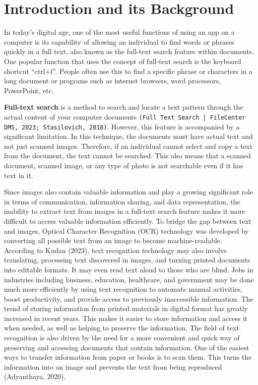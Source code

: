 \part{Introduction and its Background}

\hspace\parindent
In today’s digital age, one of the most useful functions of using an app on a computer is its
capability of allowing an individual to find words or phrases quickly in a full text, also known as
the full-text search feature within documents. One popular function that uses the concept of
full-text search is the keyboard shortcut “ctrl+f”. People often use this to find a specific phrase
or characters in a long document or programs such as internet browsers, word processors,
PowerPoint, etc.

\hfill

\textbf{Full-text search} is a method to search and locate a text pattern through the actual content
of your computer documents \texttt{(Full Text Search | FileCenter DMS, 2023; Stasilovich, 2018)}.
However, this feature is accompanied by a significant limitation. In this technique, the documents
must have actual text and not just scanned images. Therefore, if an individual cannot select and
copy a text from the document, the text cannot be searched. This also means that a scanned document,
scanned image, or any type of photo is not searchable even if it has text in it.  

\hfill

Since images also contain valuable information and play a growing significant role in terms of
communication, information sharing, and data representation, the inability to extract text from
images in a full-text search feature makes it more difficult to access valuable information
efficiently. To bridge the gap between text and images, Optical Character Recognition (OCR)
technology was developed by converting all possible text from an image to become machine-readable.
According to Kudan (2023), text recognition technology may also involve translating, processing text
discovered in images, and turning printed documents into editable formats. It may even read text
aloud to those who are blind. Jobs in industries including business, education, healthcare, and
government may be done much more efficiently by using text recognition to automate manual
activities, boost productivity, and provide access to previously inaccessible information. The trend
of storing information from printed materials in digital format has greatly increased in recent
years. This makes it easier to store information and access it when needed, as well as helping to
preserve the information. The field of text recognition is also driven by the need for a more
convenient and quick way of preserving and accessing documents that contain information. One of the
easiest ways to transfer information from paper or books is to scan them. This turns the information
into an image and prevents the text from being reproduced (Adyanthaya, 2020).

